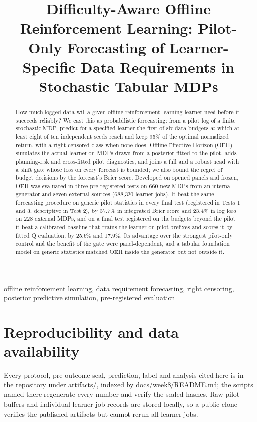 \documentclass[conference]{IEEEtran}
\begin{document}
\title{Difficulty-Aware Offline Reinforcement Learning: Pilot-Only Forecasting of Learner-Specific Data Requirements in Stochastic Tabular MDPs}
\author{
}
\maketitle

\begin{abstract}
How much logged data will a given offline reinforcement-learning learner need before it succeeds reliably? We cast this as probabilistic forecasting: from a pilot log of a finite stochastic MDP, predict for a specified learner the first of six data budgets at which at least eight of ten independent seeds reach and keep 95\% of the optimal normalized return, with a right-censored class when none does. Offline Effective Horizon (OEH) simulates the actual learner on MDPs drawn from a posterior fitted to the pilot, adds planning-risk and cross-fitted pilot diagnostics, and joins a full and a robust head with a shift gate whose loss on every forecast is bounded; we also bound the regret of budget decisions by the forecast's Brier score. Developed on opened panels and frozen, OEH was evaluated in three pre-registered tests on 660 new MDPs from an internal generator and seven external sources (688,320 learner jobs). It beat the same forecasting procedure on generic pilot statistics in every final test (registered in Tests 1 and 3, descriptive in Test 2), by 37.7\% in integrated Brier score and 23.4\% in log loss on 228 external MDPs, and on a final test registered on the budgets beyond the pilot it beat a calibrated baseline that trains the learner on pilot prefixes and scores it by fitted Q evaluation, by 25.6\% and 17.9\%. Its advantage over the strongest pilot-only control and the benefit of the gate were panel-dependent, and a tabular foundation model on generic statistics matched OEH inside the generator but not outside it.
\end{abstract}
\begin{IEEEkeywords}
offline reinforcement learning, data requirement forecasting, right censoring, posterior predictive simulation, pre-registered evaluation
\end{IEEEkeywords}









\section*{Reproducibility and data availability}
Every protocol, pre-outcome seal, prediction, label and analysis cited here is in the repository under \url{artifacts/}, indexed by \url{docs/week8/README.md}; the scripts named there regenerate every number and verify the sealed hashes. Raw pilot buffers and individual learner-job records are stored locally, so a public clone verifies the published artifacts but cannot rerun all learner jobs.



\end{document}
